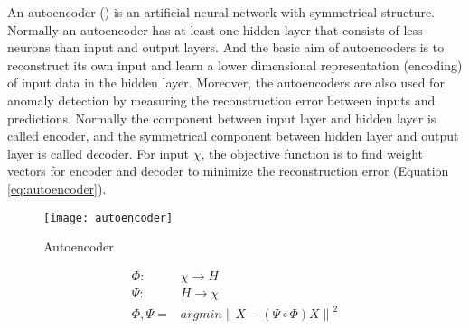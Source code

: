 An autoencoder () is an artificial neural network with symmetrical structure. Normally an autoencoder has at least one hidden layer that consists of less neurons than input and output layers. And the basic aim of autoencoders is to reconstruct its own input and learn a lower dimensional representation (encoding) of input data in the hidden layer. Moreover, the autoencoders are also used for anomaly detection by measuring the reconstruction error between inputs and predictions.
Normally the component between input layer and hidden layer is called encoder, and the symmetrical component between hidden layer and output layer is called decoder. For input $\chi$, the objective function is to find weight vectors for encoder and decoder to minimize the reconstruction error (Equation \ref{eq:autoencoder}).\\

\begin{figure}[h]
\centering
\texttt{[image: autoencoder]}
\caption[Autoencoder]{Autoencoder}
\label{fig:autoencoder}
\end{figure}

\begin{equation} \label{eq:autoencoder}
\begin{aligned}
\Phi : &\chi \rightarrow H \\
\Psi : &H \rightarrow \chi \\
\Phi, \Psi = &argmin \left \| X-(\Psi \circ \Phi)X \right \|^2
\end{aligned}
\end{equation}

